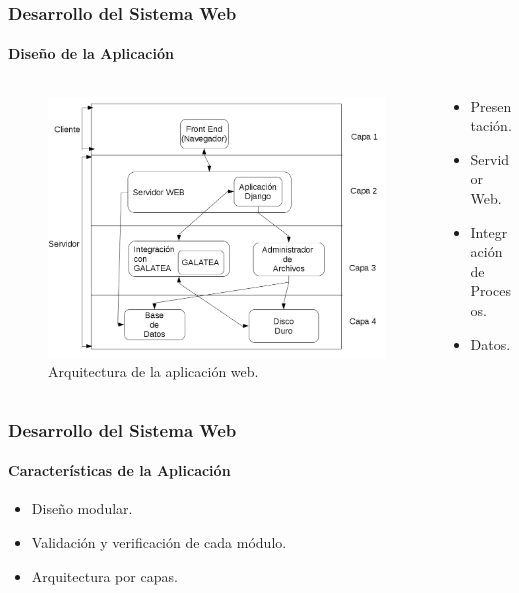 \documentclass[spanish,xcolor=dvipsnames]{beamer}
\begin{document}
    \begin{frame}
    	\frametitle{Desarrollo del Sistema Web}
    	\framesubtitle{Diseño de la Aplicación}
    	
    	\begin{columns}
    		\begin{column}{.7\linewidth}
    			\begin{figure}[H]
    				\centering
    				\includegraphics[scale=0.29]{img/arquitecturaAplicacion.png}
    				\caption{Arquitectura de la aplicación web.}
    				\label{arquitecturaAplicacion}
    			\end{figure}
    		\end{column}
    		\begin{column}{.3\linewidth}
    			\begin{itemize}
    				\item Presentación.
    				\item Servidor Web.
    				\item Integración de Procesos.
    				\item Datos.
    			\end{itemize}
    		\end{column}
    		
    	\end{columns}
    	
    \end{frame}
    \begin{frame}
    	\frametitle{Desarrollo del Sistema Web}
    	\framesubtitle{Características de la Aplicación}
    	
    	\begin{itemize}
    		\item Diseño modular.
    		\item Validación y verificación de cada módulo.
    		\item Arquitectura por capas.
    	\end{itemize}
    	
    \end{frame}
\end{document}
